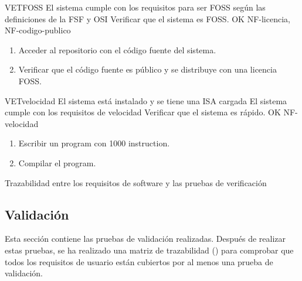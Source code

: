 \begin{testCase}{VET}{FOSS}
    {\NA} %
    {El sistema cumple con los requisitos para ser \gls{FOSS} según las
    definiciones de la \gls{FSF} \parencite{FreeSoftware} y \gls{OSI}
    \parencite{OpenSource}} %
    {Verificar que el sistema es \gls{FOSS}.} %
    {OK} %
    {NF-licencia, NF-codigo-publico} %
    \begin{enumerate}[leftmargin=*, topsep=0pt, noitemsep] %
        \item Acceder al repositorio con el código fuente del sistema.
        \item Verificar que el código fuente es público y se distribuye con una licencia \gls{FOSS}.
    \end{enumerate}
\end{testCase}

\begin{testCase}{VET}{velocidad}
    {El sistema está instalado y se tiene una \gls{ISA} cargada} %
    {El sistema cumple con los requisitos de velocidad} %
    {Verificar que el sistema es rápido.} %
    {OK} %
    {NF-velocidad} %
    \begin{enumerate}[leftmargin=*, topsep=0pt, noitemsep] %
        \item Escribir un \gls{program} con 1000 \gls{instruction}.
        \item Compilar el \gls{program}.
    \end{enumerate}
\end{testCase}

\begin{landscape}
        {Trazabilidad entre los requisitos de software y las pruebas de verificación}
\end{landscape}

\FloatBarrier

\subsection{Validación}\label{subsec:validation}

Esta sección contiene las pruebas de validación realizadas. Después de realizar
estas pruebas, se ha realizado una matriz de trazabilidad
() para comprobar que todos los requisitos de
usuario están cubiertos por al menos una prueba de validación.

